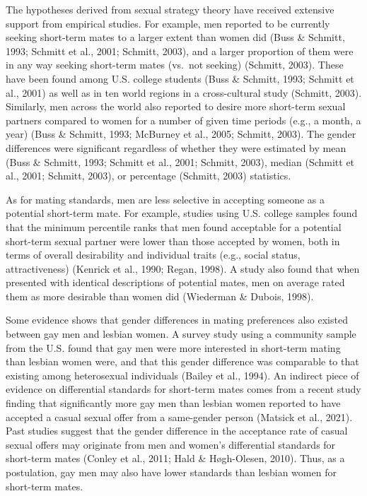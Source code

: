 \documentclass[
  11pt,
]{article}
\begin{document}
The hypotheses derived from sexual strategy theory have received
extensive support from empirical studies. For example, men reported to
be currently seeking short-term mates to a larger extent than women did
(Buss \& Schmitt, 1993; Schmitt et al., 2001; Schmitt, 2003), and a
larger proportion of them were in any way seeking short-term mates
(vs.~not seeking) (Schmitt, 2003). These have been found among U.S.
college students (Buss \& Schmitt, 1993; Schmitt et al., 2001) as well
as in ten world regions in a cross-cultural study (Schmitt, 2003).
Similarly, men across the world also reported to desire more short-term
sexual partners compared to women for a number of given time periods
(e.g., a month, a year) (Buss \& Schmitt, 1993; McBurney et al., 2005;
Schmitt, 2003). The gender differences were significant regardless of
whether they were estimated by mean (Buss \& Schmitt, 1993; Schmitt et
al., 2001; Schmitt, 2003), median (Schmitt et al., 2001; Schmitt, 2003),
or percentage (Schmitt, 2003) statistics.

As for mating standards, men are less selective in accepting someone as
a potential short-term mate. For example, studies using U.S. college
samples found that the minimum percentile ranks that men found
acceptable for a potential short-term sexual partner were lower than
those accepted by women, both in terms of overall desirability and
individual traits (e.g., social status, attractiveness) (Kenrick et al.,
1990; Regan, 1998). A study also found that when presented with
identical descriptions of potential mates, men on average rated them as
more desirable than women did (Wiederman \& Dubois, 1998).

Some evidence shows that gender differences in mating preferences also
existed between gay men and lesbian women. A survey study using a
community sample from the U.S. found that gay men were more interested
in short-term mating than lesbian women were, and that this gender
difference was comparable to that existing among heterosexual
individuals (Bailey et al., 1994). An indirect piece of evidence on
differential standards for short-term mates comes from a recent study
finding that significantly more gay men than lesbian women reported to
have accepted a casual sexual offer from a same-gender person (Matsick
et al., 2021). Past studies suggest that the gender difference in the
acceptance rate of casual sexual offers may originate from men and
women's differential standards for short-term mates (Conley et al.,
2011; Hald \& Høgh-Olesen, 2010). Thus, as a postulation, gay men may
also have lower standards than lesbian women for short-term mates.
\end{document}
